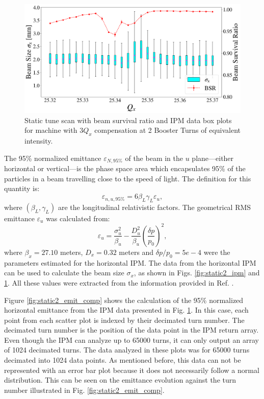 \begin{figure}[H]
    \centering
    \includegraphics[width=\columnwidth]{chapter4/static2turns_comp_ipm_dampersOFF.png}
    \caption{Static tune scan with beam survival ratio and IPM data box plots for machine with $3Q_x$ compensation at 2 Booster Turns of equivalent intensity.}
    \label{fig:static2_ipm_comp}
\end{figure}

The 95\% normalized emittance $\varepsilon_{N,95\%}$ of the beam in the $u$ plane---either horizontal or vertical---is the phase space area which encapsulates 95\% of the particles in a beam travelling close to the speed of light. The definition for this quantity is:
\begin{equation}
    \label{eq:95emittance}
    \varepsilon_{n,u,95\%} = 6 \beta_L \gamma_L \varepsilon_u,
\end{equation}
where $(\beta_L,\gamma_L)$ are the longitudinal relativistic factors. The geometrical RMS emittance $\varepsilon_u$ was calculated from:
\begin{equation}
    \label{eq:emittance}
    \varepsilon_{u} = \frac{\sigma_u ^2}{\beta_u}-\frac{D_u^2}{\beta_u} \left( \frac{\delta p}{p_0}\right)^2,
\end{equation}
where $\beta_x=27.10$ meters, $D_x=0.32$ meters and $\delta p/p_0=5e-4$ were the parameters estimated for the horizontal IPM. The data from the horizontal IPM can be used to calculate the beam size $\sigma_x$, as shown in Figs. \ref{fig:static2_ipm} and \ref{fig:static2_ipm_comp}. All these values were extracted from the information provided in Ref. \cite{betiay}.

Figure \ref{fig:static2_emit_comp} shows the calculation of the 95\% normalized horizontal emittance from the IPM data presented in Fig. \ref{fig:static2_ipm_comp}. In this case, each point from each scatter plot is indexed by their decimated turn number. The decimated turn number is the position of the data point in the IPM return array. Even though the IPM can analyze up to 65000 turns, it can only output an array of 1024 decimated turns. The data analyzed in these plots was for 65000 turns decimated into 1024 data points. As mentioned before, this data can not be represented with an error bar plot because it does not necessarily follow a normal distribution. This can be seen on the emittance evolution against the turn number illustrated in Fig. \ref{fig:static2_emit_comp}.  

